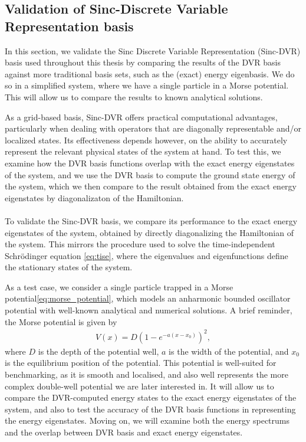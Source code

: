 \documentclass{subfiles}
\begin{document}
\subsection{Validation of Sinc-Discrete Variable Representation basis}\label{sec:sinc_dvr_validation}
In this section, we validate the Sinc Discrete Variable Representation (Sinc-DVR) basis used throughout this thesis by comparing the results of the DVR basis against more traditional basis sets, such as the (exact) energy eigenbasis. We do so in a simplified system, where we have a single particle in a Morse potential. This will allow us to compare the results to known analytical solutions. 

As a grid-based basis, Sinc-DVR offers practical computational advantages, particularly when dealing with operators that are diagonally representable and/or localized states. Its effectiveness depends however, on the ability to accurately represent the relevant physical states of the system at hand. To test this, we examine how the DVR basis functions overlap with the exact energy eigenstates of the system, and we use the DVR basis to compute the ground state energy of the system, which we then compare to the result obtained from the exact energy eigenstates by diagonalizaton of the Hamiltonian. 
\\ \\
To validate the Sinc-DVR basis, we compare its performance to the exact energy eigenstates of the system, obtained by directly diagonalizing the Hamiltonian of the system. This mirrors the procedure used to solve the time-independent Schrödinger equation \eqref{eq:tise}, where the eigenvalues and eigenfunctions define the stationary states of the system.

As a test case, we consider a single particle trapped in a Morse potential\eqref{eq:morse_potential}, which models an anharmonic bounded oscillator potential with well-known analytical and numerical solutions. A brief reminder, the Morse potential is given by
\begin{align*}
    V(x) = D \left(1 - e^{-a(x - x_0)}\right)^2,
\end{align*}
where $D$ is the depth of the potential well, $a$ is the width of the potential, and $x_0$ is the equilibrium position of the potential. This potential is well-suited for benchmarking, as it is smooth and localised, and also well represents the more complex double-well potential we are later interested in. It will allow us to compare the DVR-computed energy states to the exact energy eigenstates of the system, and also to test the accuracy of the DVR basis functions in representing the energy eigenstates. Moving on, we will examine both the energy spectrums and the overlap between DVR basis and exact energy eigenstates. 
\end{document}
